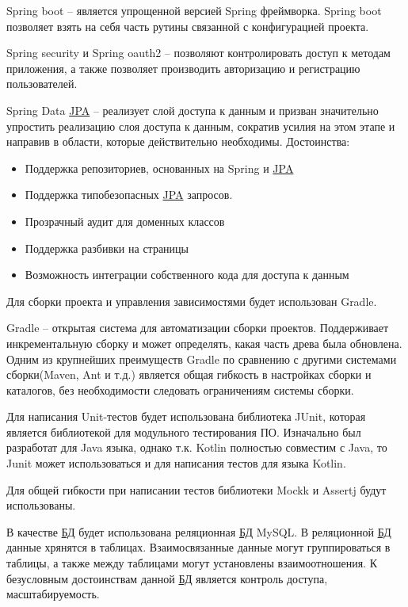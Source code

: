 Spring boot – является упрощенной версией Spring фреймворка.
Spring boot позволяет взять на себя часть рутины связанной с конфигурацией проекта.

Spring security и Spring oauth2 – позволяют контролировать доступ к методам приложения, а также позволяет производить авторизацию и регистрацию пользователей.

Spring Data \hyperlink{gloss:jpa}{JPA} – реализует слой доступа к данным и призван значительно упростить реализацию слоя доступа к данным, сократив усилия на этом этапе и направив в области, которые действительно необходимы.
Достоинства:
\begin{itemize}
    \item Поддержка репозиториев, основанных на Spring и \hyperlink{gloss:jpa}{JPA}
    \item Поддержка типобезопасных \hyperlink{gloss:jpa}{JPA} запросов.
    \item Прозрачный аудит для доменных классов
    \item Поддержка разбивки на страницы
    \item Возможность интеграции собственного кода для доступа к данным
\end{itemize}

Для сборки проекта и управления зависимостями будет использован Gradle.

Gradle – открытая система для автоматизации сборки проектов.
Поддерживает инкрементальную сборку и может определять, какая часть древа была обновлена.
Одним из крупнейших преимуществ Gradle по сравнению с другими системами сборки(Maven, Ant и т.д.) является общая гибкость в настройках сборки и каталогов, без необходимости следовать ограничениям системы сборки.

Для написания Unit-тестов будет использована библиотека JUnit, которая является библиотекой для модульного тестирования \hypertarget{gloss:software}{ПО}.
Изначально был разработат для Java языка, однако т.к. Kotlin полностью совместим с Java, то Junit может использоваться и для написания тестов для языка Kotlin.

Для общей гибкости при написании тестов библиотеки Mockk и Assertj будут использованы.

В качестве \hyperlink{gloss:db}{БД} будет использована реляционная \hyperlink{gloss:db}{БД} MySQL. В реляционной \hyperlink{gloss:db}{БД} данные хрянятся в таблицах.
Взаимосвязанные данные могут группироваться в таблицы, а также между таблицами могут установлены взаимоотношения.
К безусловным достоинствам данной \hyperlink{gloss:db}{БД} является контроль доступа, масштабируемость.

